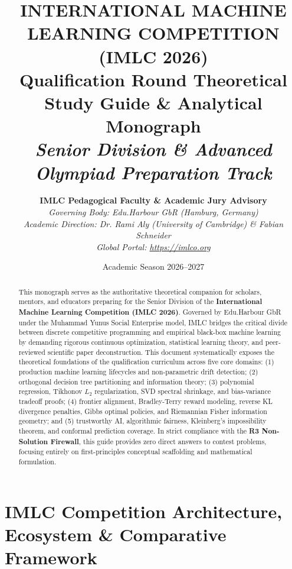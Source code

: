 \documentclass[11pt,a4paper]{article}
\title{\vspace{-1.2cm}\Large\textbf{INTERNATIONAL MACHINE LEARNING COMPETITION (IMLC 2026)}\\[0.3cm]
\large\textbf{Qualification Round Theoretical Study Guide \& Analytical Monograph}\\[0.1cm]
\normalsize\textit{Senior Division \& Advanced Olympiad Preparation Track}}
\author{\textbf{IMLC Pedagogical Faculty \& Academic Jury Advisory} \\
\textit{Governing Body: Edu.Harbour GbR (Hamburg, Germany)} \\
\textit{Academic Direction: Dr. Rami Aly (University of Cambridge) \& Fabian Schneider} \\
\textit{Global Portal: \url{https://imlco.org}}}
\date{Academic Season 2026--2027}
\theoremstyle{definition}
\theoremstyle{plain}
\theoremstyle{remark}
\begin{document}
\maketitle
\thispagestyle{fancy}

\begin{abstract}
This monograph serves as the authoritative theoretical companion for scholars, mentors, and educators preparing for the Senior Division of the \textbf{International Machine Learning Competition (IMLC 2026)}. Governed by Edu.Harbour GbR under the Muhammad Yunus Social Enterprise model, IMLC bridges the critical divide between discrete competitive programming and empirical black-box machine learning by demanding rigorous continuous optimization, statistical learning theory, and peer-reviewed scientific paper deconstruction. This document systematically exposes the theoretical foundations of the qualification curriculum across five core domains: (1) production machine learning lifecycles and non-parametric drift detection; (2) orthogonal decision tree partitioning and information theory; (3) polynomial regression, Tikhonov $L_2$ regularization, SVD spectral shrinkage, and bias-variance tradeoff proofs; (4) frontier alignment, Bradley-Terry reward modeling, reverse KL divergence penalties, Gibbs optimal policies, and Riemannian Fisher information geometry; and (5) trustworthy AI, algorithmic fairness, Kleinberg's impossibility theorem, and conformal prediction coverage. In strict compliance with the \textbf{R3 Non-Solution Firewall}, this guide provides zero direct answers to contest problems, focusing entirely on first-principles conceptual scaffolding and mathematical formulation.
\end{abstract}

\tableofcontents
\newpage

\section{IMLC Competition Architecture, Ecosystem \& Comparative Framework}
\end{document}
